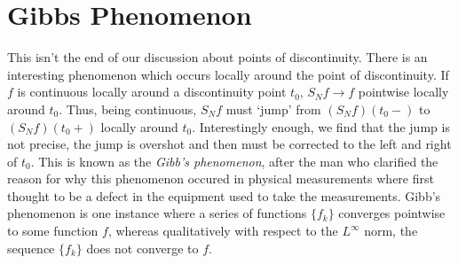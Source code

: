 
\section{Gibbs Phenomenon}

This isn't the end of our discussion about points of discontinuity. There is an interesting phenomenon which occurs locally around the point of discontinuity. If $f$ is continuous locally around a discontinuity point $t_0$, $S_N f \to f$ pointwise locally around $t_0$. Thus, being continuous, $S_N f$ must `jump' from $(S_N f)(t_0-)$ to $(S_N f)(t_0+)$ locally around $t_0$. Interestingly enough, we find that the jump is not precise, the jump is overshot and then must be corrected to the left and right of $t_0$. This is known as the {\it Gibb's phenomenon}, after the man who clarified the reason for why this phenomenon occured in physical measurements where first thought to be a defect in the equipment used to take the measurements. Gibb's phenomenon is one instance where a series of functions $\{ f_k \}$ converges pointwise to some function $f$, whereas qualitatively with respect to the $L^\infty$ norm, the sequence $\{ f_k \}$ does not converge to $f$.

